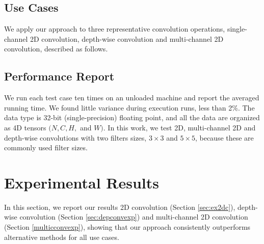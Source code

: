 \subsection{Use Cases}
We apply our approach to three representative convolution operations, single-channel 2D convolution, depth-wise convolution and
multi-channel 2D convolution, described as follows.

 

 

 


\subsection{Performance Report} We run each test case ten times on an unloaded machine and report the averaged running time. We found
little variance during execution runs, less than 2\%.  The data type is 32-bit (single-precision) floating point, and all the data are
organized as 4D tensors $(N,C,H,$ and $W)$. In this work, we test 2D, multi-channel 2D and depth-wise convolutions with two filters sizes,
$3 \times 3$ and $5 \times 5$, because these are commonly used filter sizes.

\section{Experimental Results}
\label{exp} In this section, we report our results 2D convolution (Section \ref{sec:ex2dc}), depth-wise convolution (Section
\ref{sec:depconvexp}) and multi-channel 2D convolution (Section \ref {multicconvexp}), showing that our approach consistently outperforms
alternative methods for all use cases.


